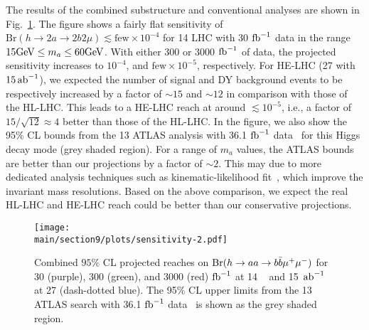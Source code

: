 The results of the combined substructure and conventional analyses are shown in Fig.~\ref{bbmumu}. The figure shows a fairly flat sensitivity of  $\mathrm{Br}(h \to 2a \to 2b2\mu) \lesssim \text{few}\times10^{-4}$ for 14 \UTeV LHC with 30 ${\rm fb}^{-1}$ data in the range $15\text{GeV} \leq m_a \leq 60 \text{GeV}$. With either 300 or 3000 ${\rm fb}^{-1}$ of data, the projected sensitivity increases to  $10^{-4}$, and $\text{few}\times 10^{-5}$, respectively. For HE-LHC (27 \UTeV with $15\mbox{\ensuremath{\,\text{ab}^\text{$-$1}}}$), we expected the number of signal and DY background events to be respectively increased by a factor of $\sim15$ and $\sim12$ in comparison with those of the HL-LHC. This leads to a HE-LHC reach at around $\lesssim 10^{-5}$, i.e., a factor of $15/\sqrt{12}\approx 4$ better than those of the HL-LHC. In the figure, we also show the 95\% CL bounds from the 13 \UTeV ATLAS analysis with 36.1 ${\rm fb}^{-1}$ data~\cite{Aaboud:2018esj} for this Higgs decay mode (grey shaded region). For a range of $m_a$ values, the ATLAS bounds are better than our projections  by a factor of $\sim 2$. This may due to more dedicated analysis techniques such as kinematic-likelihood fit~\cite{Aaboud:2018esj}, which improve the invariant mass resolutions. Based on the above comparison, we expect the real HL-LHC and HE-LHC reach could be better than our conservative projections. 



\begin{figure}[h]
\begin{center}
\texttt{[image: \\main/section9/plots/sensitivity-2.pdf]}
\caption{\small Combined $95\%$ CL projected reaches on ${\mathrm{Br}}(h\to aa \to b\bar{b}\mu^+ \mu^-)$ for 30 (purple), 300 (green), and 3000 (red) ${\rm fb}^{-1}$ at 14 \UTeV~\cite{Curtin:2014pda} and 15 $\mbox{\ensuremath{\,\text{ab}^\text{$-$1}}}$ at 27 \UTeV (dash-dotted blue). The 95\% CL upper limits from the 13 \UTeV ATLAS search with 36.1 ${\rm fb}^{-1}$ data~\cite{Aaboud:2018esj} is shown as the grey shaded region.}
\label{bbmumu}
\end{center}
\end{figure}
